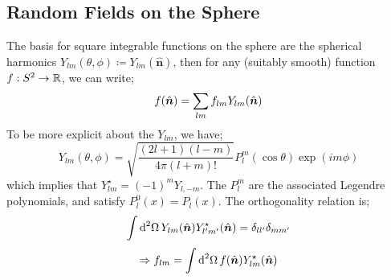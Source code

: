 \subsection{Random Fields on the Sphere}
The basis for square integrable functions on the sphere are the spherical harmonics $Y_{lm}(\theta, \phi) \coloneqq Y_{lm}(\hat{\bm{n}})$\footnotemark, then for any (suitably smooth) function $f : S^2 \rightarrow \mathbb{R}$, we can write;
\begin{equation}
f(\hat{\bm{n}}) = \sum_{lm}{f_{lm}Y_{lm}(\hat{\bm{n}})}
\end{equation}
To be more explicit about the $Y_{lm}$, we have;
\begin{equation}
\label{eq:ylmexplicit}
Y_{lm}(\theta, \phi) = \sqrt{\frac{(2l + 1)(l - m)}{4\pi(l + m)!}}P_l^m(\cos \theta)\exp(im \phi)
\end{equation}
which implies that $Y_{lm}^{\star} = (-1)^m Y_{l, -m}$. The $P_{l}^m$ are the associated Legendre polynomials, and satisfy $P_l^0(x) = P_l(x)$. The orthogonality relation is;
\begin{equation}
\label{eq:ylmorthog}
\int{\text{d}^2 \Omega \,Y_{lm}(\hat{\bm{n}})Y^{\star}_{l^{\prime}m^{\prime}}(\hat{\bm{n}})} = \delta_{l l^{\prime}}\delta_{m m^{\prime}}
\end{equation}
\begin{equation}
\Rightarrow f_{lm} = \int{\text{d}^2 \Omega \, f(\hat{\bm{n}}) Y_{lm}^\star(\hat{\bm{n}})}
\end{equation}

